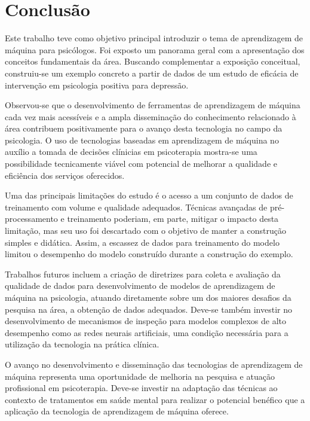 \section{Conclusão}

Este trabalho teve como objetivo principal introduzir o tema de aprendizagem de máquina para psicólogos. Foi exposto
um panorama geral com a apresentação dos conceitos fundamentais da área. Buscando complementar a exposição conceitual,
construiu-se um exemplo concreto a partir de dados de um estudo de eficácia de intervenção em psicologia positiva para
depressão.

Observou-se que o desenvolvimento de ferramentas de aprendizagem de máquina cada vez mais acessíveis e a ampla disseminação
do conhecimento relacionado à área contribuem positivamente para o avanço desta tecnologia no campo da psicologia. O uso de
tecnologias baseadas em aprendizagem de máquina no auxílio a tomada de decisões clínicias em psicoterapia mostra-se uma
possibilidade tecnicamente viável com potencial de melhorar a qualidade e eficiência dos serviços oferecidos.

Uma das principais limitações do estudo é o acesso a um conjunto de dados de treinamento com volume e qualidade adequados.
Técnicas avançadas de pré-processamento e treinamento poderiam, em parte, mitigar o impacto desta limitação, mas seu uso foi
descartado com o objetivo de manter a construção simples e didática. Assim, a escassez de dados para treinamento do modelo
limitou o desempenho do modelo construído durante a construção do exemplo.

Trabalhos futuros incluem a criação de diretrizes para coleta e avaliação da qualidade de dados para desenvolvimento de modelos de
aprendizagem de máquina na psicologia, atuando diretamente sobre um dos maiores desafios da pesquisa na área, a obtenção de dados
adequados. Deve-se também investir no desenvolvimento de mecanismos de inspeção para modelos complexos de alto desempenho como as
redes neurais artificiais, uma condição necessária para a utilização da tecnologia na prática clínica.

O avanço no desenvolvimento e disseminação das tecnologias de aprendizagem de máquina representa uma oportunidade de melhoria
na pesquisa e atuação profissional em psicoterapia. Deve-se investir na adaptação das técnicas ao contexto de tratamentos em saúde
mental para realizar o potencial benéfico que a aplicação da tecnologia de aprendizagem de máquina oferece.